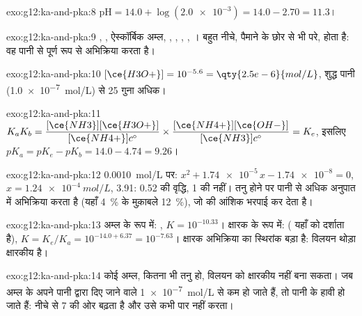 \begin{solution}{exo:g12:ka-and-pka:8}
$\mathrm{pH} = 14.0 + \log(\num{2.0e-3}) = 14.0 - 2.70 = 11.3$।
\end{solution}

\begin{solution}{exo:g12:ka-and-pka:9}
, , ऐस्कॉर्बिक अम्ल, , ,
, , ।  बहुत नीचे,
पैमाने के छोर से भी परे, होता है: वह पानी से पूर्ण रूप से अभिक्रिया करता है।
\end{solution}

\begin{solution}{exo:g12:ka-and-pka:10}
$[\ce{H3O+}] = 10^{-5.6} = \qty{2.5e-6}{mol/L}$, शुद्ध पानी
(\qty{1.0e-7}{mol/L}) से 25 गुना अधिक।
\end{solution}

\begin{solution}{exo:g12:ka-and-pka:11}
$K_a K_b = \dfrac{[\ce{NH3}][\ce{H3O+}]}{[\ce{NH4+}]c^\circ} \times
\dfrac{[\ce{NH4+}][\ce{OH-}]}{[\ce{NH3}]c^\circ} = K_e$, इसलिए
$pK_a = pK_e - pK_b = 14.0 - 4.74 = 9.26$।
\end{solution}

\begin{solution}{exo:g12:ka-and-pka:12}
\qty{0.0010}{mol/L} पर: $x^2 + \num{1.74e-5}\,x - \num{1.74e-8} = 0$,
$x = \qty{1.24e-4}{mol/L}$,  3.91: 0.52 की वृद्धि, 1 की नहीं। तनु होने पर
 पानी से अधिक अनुपात में अभिक्रिया करता है (यहाँ
\qty{4}{\percent} के मुक़ाबले \qty{12}{\percent}), जो  की
आंशिक भरपाई कर देता है।
\end{solution}

\begin{solution}{exo:g12:ka-and-pka:13}
अम्ल के रूप में: , $K = 10^{-10.33}$।
क्षारक के रूप में:  ( यहाँ  को दर्शाता है), $K = K_e/K_a = 10^{-14.0+6.37}
= 10^{-7.63}$। क्षारक अभिक्रिया का स्थिरांक बड़ा है: विलयन
थोड़ा क्षारकीय है।
\end{solution}

\begin{solution}{exo:g12:ka-and-pka:14}
कोई अम्ल, कितना भी तनु हो, विलयन को क्षारकीय नहीं बना सकता। जब अम्ल के
अपने  पानी द्वारा दिए जाने वाले \qty{1e-7}{mol/L} से कम हो जाते हैं,
तो पानी के  हावी हो जाते हैं:  नीचे से 7 की ओर बढ़ता है और
उसे कभी पार नहीं करता।
\end{solution}

